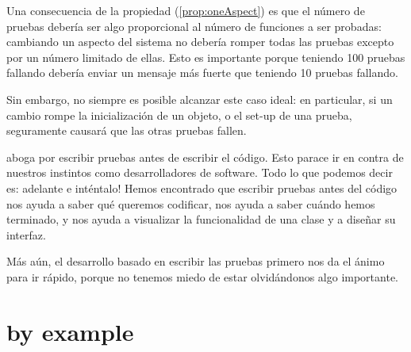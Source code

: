 \documentclass[a4paper,10pt,twoside]{book}
\begin{document}
Una consecuencia de la propiedad (\ref{prop:oneAspect}) es que 
el n\'umero de pruebas deber\'ia ser algo proporcional al n\'umero de funciones
a ser probadas: cambiando un aspecto del sistema no deber\'ia romper todas las pruebas
excepto por un n\'umero limitado de ellas. Esto es importante porque teniendo 100 pruebas fallando
deber\'ia enviar un mensaje m\'as fuerte que teniendo 10 pruebas fallando.
  
Sin embargo, no siempre es posible alcanzar este caso ideal: 
en particular, si un cambio rompe la inicializaci\'on de un objeto, o el set-up de una prueba,
seguramente causar\'a que las otras pruebas fallen.

 aboga por escribir pruebas antes de escribir el c\'odigo.
Esto parace ir en contra de nuestros instintos como desarrolladores de software. 
Todo lo que podemos decir es: adelante e int\'entalo!
Hemos encontrado que escribir pruebas antes del c\'odigo nos ayuda a saber qu\'e queremos codificar,
nos ayuda a saber cu\'ando hemos terminado, y nos ayuda a visualizar la funcionalidad
de una clase y a dise\~nar su interfaz.

M\'as a\'un, el desarrollo basado en escribir las pruebas primero nos da el \'animo para ir r\'apido, porque no tenemos miedo de estar olvid\'andonos algo importante.






\section{\sunit by example}
\end{document}
